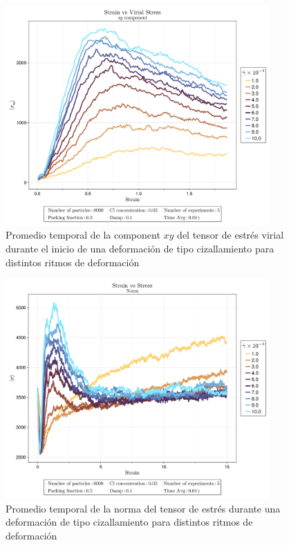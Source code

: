 \documentclass[../main.tex]{subfiles}
\begin{document}
\begin{figure}[h]
    \centering
    \includegraphics[width=0.9\textwidth]{../Figures/system-2025-05-22-194804-CL-0.03/Strain-vs-Stress-Zoom.png}
    \caption{Promedio temporal de la component $xy$ del tensor de estrés virial durante el inicio de una deformación de tipo cizallamiento para distintos ritmos de deformación}\label{fig:Zoomstrain-vs-stress}
\end{figure}

\begin{figure}[h]
    \centering
    \includegraphics[width=0.9\textwidth]{../Figures/system-2025-05-22-194804-CL-0.03/Strain-vs-StressNORM.png}
    \caption{Promedio temporal de la norma del tensor de estrés durante una deformación de tipo cizallamiento para distintos ritmos de deformación}\label{fig:strain-vs-normstress}
\end{figure}
\end{document}

